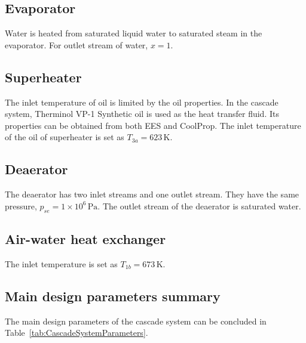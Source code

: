 \subsection{Evaporator}
Water is heated from saturated liquid water to saturated steam in the evaporator. For outlet stream of water, $x = 1$.

\subsection{Superheater}
The inlet temperature of oil is limited by the oil properties. In the cascade system, Therminol VP-1 Synthetic oil is used as the heat transfer fluid. Its properties can be obtained from both EES and CoolProp. The inlet temperature of the oil of superheater is set as $T_{3a} = 623\,\mathrm{K}$.

\subsection{Deaerator}
The deaerator has two inlet streams and one outlet stream. They have the same pressure, $p_{se} = 1\times10^6\,\mathrm{Pa}$. The outlet stream of the deaerator is saturated water.

\subsection{Air-water heat exchanger}
The inlet temperature is set as $T_{1b} = 673\,\mathrm{K}$.

\subsection{Main design parameters summary}
The main design parameters of the cascade system can be concluded in Table~\ref{tab:CascadeSystemParameters}.

